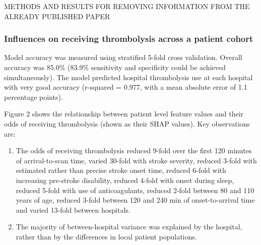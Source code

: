 METHODS AND RESULTS FOR REMOVING INFORMATION FROM THE ALREADY PUBLISHED PAPER

\subsubsection{Influences on receiving thrombolysis across a patient cohort}

Model accuracy was measured using stratified 5-fold cross validation. Overall accuracy was 85.0\% (83.9\% sensitivity and specificity could be achieved simultaneously). The model predicted hospital thrombolysis use at each hospital with very good accuracy (r-squared = 0.977, with a mean absolute error of 1.1 percentage points).

Figure 2 shows the relationship between patient level feature values and their odds of receiving thrombolysis (shown as their SHAP values). Key observations are:
\begin{enumerate}
    \item The odds of receiving thrombolysis reduced 9-fold over the first 120 minutes of arrival-to-scan time, varied 30-fold with stroke severity, reduced 3-fold with estimated rather than precise stroke onset time, reduced 6-fold with increasing pre-stroke disability, reduced 4-fold with onset during sleep, reduced 5-fold with use of anticoagulants, reduced 2-fold between 80 and 110 years of age, reduced 3-fold between 120 and 240 min of onset-to-arrival time and varied 13-fold between hospitals.
    \item The majority of between-hospital variance was explained by the hospital, rather than by the differences in local patient populations.
\end{enumerate}


